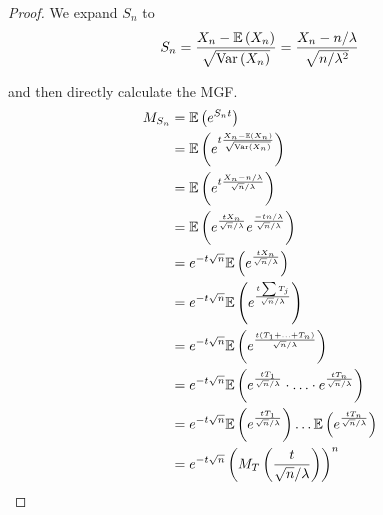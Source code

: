 \documentclass{exam}
\begin{document}
\begin{questions}
\begin{parts}
\begin{proof}
        We expand $S_n$ to
        $$S_n = \frac{X_n - \mathbb{E}\left( X_n \right)}{\sqrt{\text{Var}\left( X_n \right)}} = \frac{X_n - n / \lambda}{\sqrt{n / \lambda^2}}$$

        and then directly calculate the MGF.
        \begin{align*}
            M_{S_n} &= \mathbb{E}\left( e^{S_nt} \right) \\
            &= \mathbb{E}\left( e^{t\frac{X_n - \mathbb{E}\left( X_n \right)}{\sqrt{\text{Var}\left( X_n \right)}}} \right) \\
            &= \mathbb{E}\left( e^{t\frac{X_n - n / \lambda}{\sqrt{n} / \lambda}} \right) \\
            &= \mathbb{E}\left( e^{\frac{tX_n}{\sqrt{n} / \lambda}}e^{\frac{-tn / \lambda}{\sqrt{n} / \lambda}} \right) \\
            &= e^{-t\sqrt{n}}\mathbb{E}\left( e^{\frac{tX_n}{\sqrt{n} / \lambda}} \right) \\
            &= e^{-t\sqrt{n}}\mathbb{E}\left( e^{\frac{t\sum T_j}{\sqrt{n} / \lambda}} \right) \\
            &= e^{-t\sqrt{n}}\mathbb{E}\left( e^{\frac{t(T_1 + \hdots + T_n)}{\sqrt{n} / \lambda}} \right) \\
            &= e^{-t\sqrt{n}}\mathbb{E}\left( e^{\frac{tT_1}{\sqrt{n} / \lambda}} \cdot \hdots \cdot e^{\frac{tT_n}{\sqrt{n} / \lambda}} \right) \\
            &= e^{-t\sqrt{n}}\mathbb{E}\left( e^{\frac{tT_1}{\sqrt{n} / \lambda}} \right) \hdots \mathbb{E}\left( e^{\frac{tT_n}{\sqrt{n} / \lambda}} \right) \\
            &= e^{-t\sqrt{n}}\left( M_T\left( \frac{t}{\sqrt{n} / \lambda} \right) \right)^n
        \end{align*}
    \end{proof}


\end{parts}
\end{questions}
\end{document}
